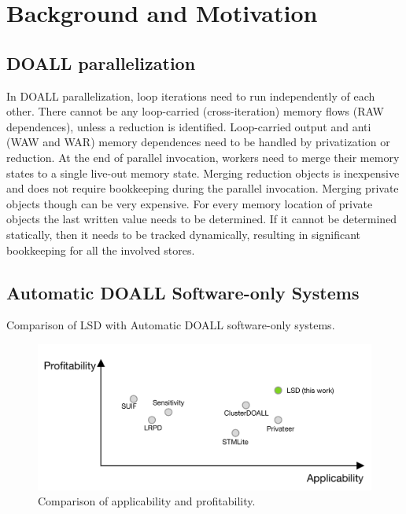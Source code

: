 \section{Background and Motivation}
\label{sec:motivation}

\subsection{DOALL parallelization}

In DOALL parallelization, loop iterations need to run independently of each
other.
%
There cannot be any loop-carried (cross-iteration) memory flows (RAW
dependences), unless a reduction is identified. Loop-carried output and anti
(WAW and WAR) memory dependences need to be handled by privatization or
reduction. At the end of parallel invocation, workers need to merge their memory
states to a single live-out memory state.  Merging reduction objects is
inexpensive and does not require bookkeeping during the parallel invocation.
Merging private objects though can be very expensive. For every memory location
of private objects the last written value needs to be determined. If it cannot
be determined statically, then it needs to be tracked dynamically, resulting in
significant bookkeeping for all the involved stores.

\subsection{Automatic DOALL Software-only Systems}

\begin{table}
  
  \caption{
    Comparison of LSD with Automatic DOALL software-only systems.
  }
  \label{tab:related-work}
    \vspace{-5pt}
\end{table}

\begin{figure}[ht]
  \includegraphics[width=\columnwidth]{figures/profit-appli-compare}
  \caption{Comparison of applicability and profitability.}
  \label{fig:profit-appli-compare}
\end{figure}

